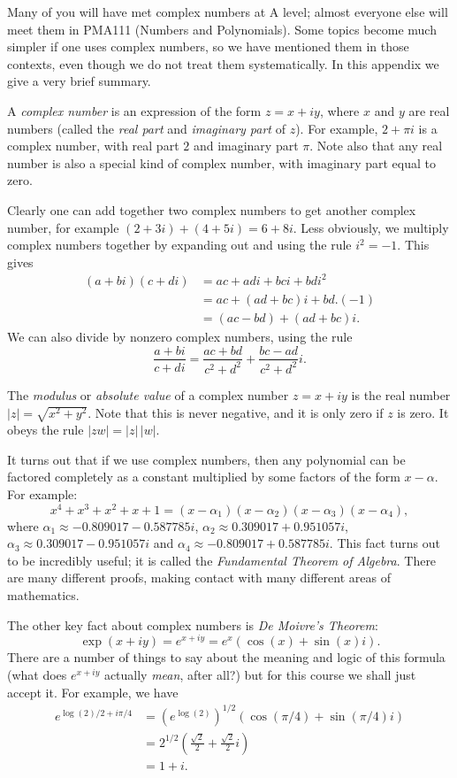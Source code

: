 \documentclass[a4paper]{book}
\newcommand{\RED}[1]{{\color{red}#1}}
\newcommand{\PURPLE}[1]{{\color{purple}#1}}
\newcommand{\al}        {\alpha}
\renewcommand{\:}{\colon}
\newcommand{\mathworld}[1]{}
\newcommand{\PMA}[1]{PMA#1}
\newcommand{\EMPH}[1]{\RED{\emph{#1}}}
\newcommand{\DEFN}[1]{\PURPLE{\emph{#1}}}
\theoremstyle{definition}
\begin{document}
Many of you will have met complex numbers at A level; almost everyone
else will meet them in \PMA{111} (Numbers and Polynomials).  Some topics
become much simpler if one uses complex numbers, so we have mentioned
them in those contexts, even though we do not treat them
systematically.  In this appendix we give a very brief summary.

A \DEFN{complex number} \mathworld{ComplexNumber} is an expression of
the form $z=x+iy$, where $x$ and $y$ are real numbers (called the
\DEFN{real part} and \DEFN{imaginary part} of $z$).  For example,
$2+\pi i$ is a complex number, with real part $2$ and imaginary part
$\pi$.  Note also that any real number is also a special kind of
complex number, with imaginary part equal to zero.

Clearly one can add together two complex numbers to get another
complex number, for example $(2+3i)+(4+5i)=6+8i$.  Less obviously, we
multiply complex numbers together by expanding out and using the rule
$i^2=-1$.  This gives
\begin{align*}
 (a+bi)(c+di) &= ac + adi + bci + bdi^2 \\
              &= ac + (ad+bc)i + bd.(-1) \\
              &= (ac-bd) + (ad+bc)i.
\end{align*}
We can also divide by nonzero complex numbers, using the rule
\[ \frac{a+bi}{c+di} = \frac{ac+bd}{c^2+d^2} + \frac{bc-ad}{c^2+d^2}i.
\]

The \DEFN{modulus} or \DEFN{absolute value} of a complex number
$z=x+iy$ is the real number $|z|=\sqrt{x^2+y^2}$.  Note that this is
never negative, and it is only zero if $z$ is zero.  It obeys the rule
$|zw|=|z|\,|w|$.

It turns out that if we use complex numbers, then any polynomial can
be factored completely as a constant multiplied by some factors of the
form $x-\al$.  For example:
\[ x^4+x^3+x^2+x+1 = (x-\al_1)(x-\al_2)(x-\al_3)(x-\al_4), \]
where $\al_1\approx -0.809017-0.587785i$,
$\al_2\approx 0.309017+0.951057i$, $\al_3\approx 0.309017-0.951057i$ and
$\al_4\approx -0.809017+0.587785i$.  This fact turns out to be
incredibly useful; it is called the \DEFN{Fundamental Theorem of
  Algebra}.  There are many different proofs, making contact with many
different areas of mathematics.

The other key fact about complex numbers is 
\DEFN{De Moivre's Theorem}: 
\[ \exp(x+iy) = e^{x+iy} = e^x(\cos(x) + \sin(x)i). \]
There are a number of things to say about the meaning and logic of
this formula (what does $e^{x+iy}$ actually \EMPH{mean}, after all?)
but for this course we shall just accept it.  For example, we have
\begin{align*}
 e^{\log(2)/2+i\pi/4}
  &= (e^{\log(2)})^{1/2} (\cos(\pi/4)+\sin(\pi/4)i) \\
  &= 2^{1/2}\left( \frac{\sqrt{2}}{2} + \frac{\sqrt{2}}{2} i\right)\\
  &= 1+i.
\end{align*}
 
\end{document}
